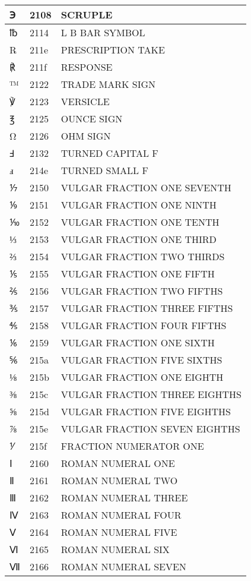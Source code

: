\documentclass[12pt,letterpaper,openany]{book}
\begin{document}
\begin{center}
\begin{supertabular}{|m{0.25in}|m{0.5in}|m{4in}|}
℈ & 2108 & SCRUPLE\\\hline
℔ & 2114 & L B BAR SYMBOL\\\hline
℞ & 211e & PRESCRIPTION TAKE\\\hline
℟ & 211f & RESPONSE\\\hline
™ & 2122 & TRADE MARK SIGN\\\hline
℣ & 2123 & VERSICLE\\\hline
℥ & 2125 & OUNCE SIGN\\\hline
Ω & 2126 & OHM SIGN\\\hline
Ⅎ & 2132 & TURNED CAPITAL F\\\hline
ⅎ & 214e & TURNED SMALL F\\\hline
⅐ & 2150 & VULGAR FRACTION ONE SEVENTH\\\hline
⅑ & 2151 & VULGAR FRACTION ONE NINTH\\\hline
⅒ & 2152 & VULGAR FRACTION ONE TENTH\\\hline
⅓ & 2153 & VULGAR FRACTION ONE THIRD\\\hline
⅔ & 2154 & VULGAR FRACTION TWO THIRDS\\\hline
⅕ & 2155 & VULGAR FRACTION ONE FIFTH\\\hline
⅖ & 2156 & VULGAR FRACTION TWO FIFTHS\\\hline
⅗ & 2157 & VULGAR FRACTION THREE FIFTHS\\\hline
⅘ & 2158 & VULGAR FRACTION FOUR FIFTHS\\\hline
⅙ & 2159 & VULGAR FRACTION ONE SIXTH\\\hline
⅚ & 215a & VULGAR FRACTION FIVE SIXTHS\\\hline
⅛ & 215b & VULGAR FRACTION ONE EIGHTH\\\hline
⅜ & 215c & VULGAR FRACTION THREE EIGHTHS\\\hline
⅝ & 215d & VULGAR FRACTION FIVE EIGHTHS\\\hline
⅞ & 215e & VULGAR FRACTION SEVEN EIGHTHS\\\hline
⅟ & 215f & FRACTION NUMERATOR ONE\\\hline
Ⅰ & 2160 & ROMAN NUMERAL ONE\\\hline
Ⅱ & 2161 & ROMAN NUMERAL TWO\\\hline
Ⅲ & 2162 & ROMAN NUMERAL THREE\\\hline
Ⅳ & 2163 & ROMAN NUMERAL FOUR\\\hline
Ⅴ & 2164 & ROMAN NUMERAL FIVE\\\hline
Ⅵ & 2165 & ROMAN NUMERAL SIX\\\hline
Ⅶ & 2166 & ROMAN NUMERAL SEVEN\\\hline

\end{supertabular}
\end{center}
\end{document}
